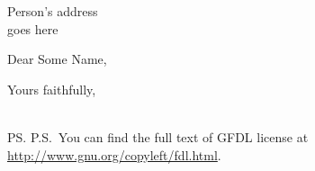 \documentclass{letter}
\begin{document}
%
    \begin{letter}{
    Person's address\\
    goes here
    }%
        \opening{Dear Some Name,}

        \lipsum[1-7]     
        
        
        
		\closing{Yours faithfully,\\
			 \\	
		}

\ps{P.S.~You can find the full text of GFDL license at
\url{http://www.gnu.org/copyleft/fdl.html}.}

     
    \end{letter}%
\end{document}
